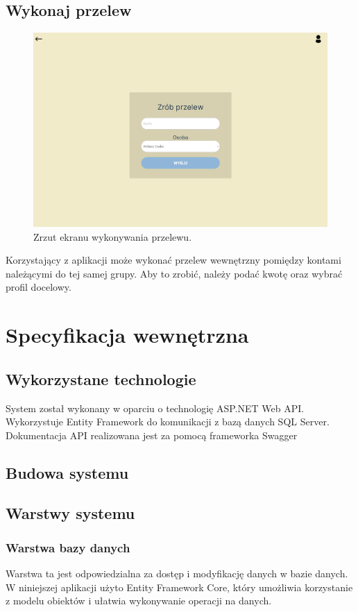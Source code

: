 \documentclass[12pt,a4paper,oneside]{article}
\begin{document}
\subsection{Wykonaj przelew}
\begin{figure}[H]
    \centering
    \includegraphics[width=\hsize,keepaspectratio]{images/make_transfer.png}
    \caption{Zrzut ekranu wykonywania przelewu.}
\end{figure}
Korzystający z aplikacji może wykonać przelew wewnętrzny pomiędzy kontami
należącymi do tej samej grupy. Aby to zrobić, należy podać kwotę oraz wybrać
profil docelowy.

\section{Specyfikacja wewnętrzna}
\subsection{Wykorzystane technologie}
System został wykonany w oparciu o technologię ASP.NET Web API. Wykorzystuje
Entity Framework do komunikacji z bazą danych SQL Server. Dokumentacja API
realizowana jest za pomocą frameworka Swagger

\subsection{Budowa systemu}

\subsection{Warstwy systemu}
\subsubsection{Warstwa bazy danych}
Warstwa ta jest odpowiedzialna za dostęp i modyfikację danych w bazie danych.
W niniejszej aplikacji użyto Entity Framework Core, który umożliwia korzystanie
z modelu obiektów i ułatwia wykonywanie operacji na danych.
\end{document}
